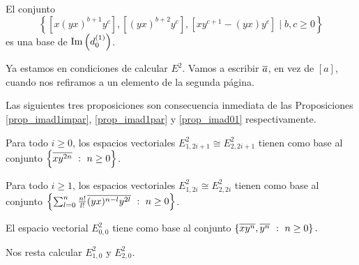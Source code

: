 \documentclass[fleqn,../tesis.tex]{subfiles}
\begin{document}
\begin{prop} \label{prop_imad01}
    El conjunto
    \[
        \left\lbrace \left[x(yx)^{b + 1}y^c\right], \left[(yx)^{b + 2}y^c\right], \left[xy^{c + 1} - (yx)y^c\right] \mid b,c \geq 0 \right\rbrace    
    \]
    es una base de $\operatorname{Im}\left(d_0^{(1)}\right)$.
\end{prop}

Ya estamos en condiciones de calcular $E^{2}$. Vamos
a escribir $\overline{a}$, en vez de $\left[a\right]$, cuando nos refiramos a un elemento de la segunda página.

Las siguientes tres proposiciones son consecuencia inmediata de las Proposiciones \ref{prop_imad1impar}, \ref{prop_imad1par} y \ref{prop_imad01}
respectivamente.
\begin{prop} 
    Para todo $i \geq 0$, los espacios vectoriales $E_{1,2i + 1}^2 \cong E_{2, 2i + 1}^2$
	tienen como base al conjunto $\left\{ \overline{xy^{2n}} \ :\ n \geq 0\right\}$.
\end{prop}

\begin{prop}
    Para todo $i \geq 1$, los espacios vectoriales $E_{1,2i}^2 \cong E_{2, 2i}^2$
	tienen como base al conjunto $\left\{ \sum_{l = 0}^n \frac{n!}{l!}\overline{(yx)^{n - l}y^{2l}} \ :\ n \geq 0\right\}$.
\end{prop}

\begin{prop}
    El espacio vectorial $E^{2}_{0, 0}$ tiene como base al conjunto $\left\{ \overline{xy^{n}}, \overline{y^n} \ :\ n \geq 0\right\}.$
\end{prop}

Nos resta calcular $E^2_{1,0}$ y $E^2_{2, 0}$.
\end{document}
